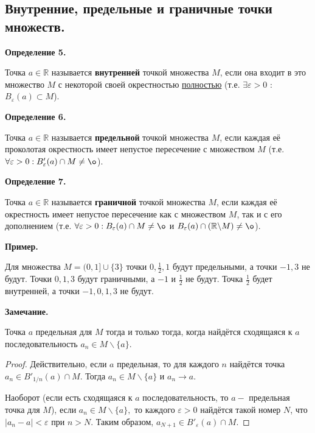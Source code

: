 \documentclass[12pt]{article}
\begin{document}
\subsection{Внутренние, предельные и граничные точки множеств.}

\textbf{Определение 5.}

Точка $a\in\mathbb{R}$ называется \textbf{внутренней} точкой множества $M$, если она входит в это множество $M$ с некоторой своей окрестностью \underline{полностью} (т.е. $\exists\varepsilon > 0$ : $B_\varepsilon(a)\subset M$).

\textbf{Определение 6.}

Точка $a\in\mathbb{R}$ называется \textbf{предельной} точкой множества $M$, если каждая её проколотая окрестность имеет непустое пересечение с множеством $M$ (т.е. $\forall\varepsilon > 0: B'_\varepsilon(a)\cap M\neq \o$).

\textbf{Определение 7.}

Точка $a\in\mathbb{R}$ называется \textbf{граничной} точкой множества $M$, если каждая её окрестность имеет непустое пересечение как с множеством $M$, так и с его дополнением (т.е. $\forall\varepsilon > 0: B_\varepsilon(a)\cap M\neq \o$ и $B_\varepsilon(a)\cap(\mathbb{R}\backslash M)\neq\o$).

\textbf{Пример.}

Для множества $M = (0, 1]\cup\{3\}$ точки $0, \frac{1}{2}, 1$ будут предельными, а точки $-1, 3$ не будут. Точки $0, 1, 3$ будут граничными, а $-1$ и $\frac{1}{2}$ не будут. Точка $\frac{1}{2}$ будет внутренней, а точки $-1, 0, 1, 3$ не будут.

\textbf{Замечание.}

Точка $a$ предельная для $M$ тогда и только тогда, когда найдётся сходящаяся к $a$ последовательность $a_n \in M\backslash\{a\}$. 

\begin{proof}
Действительно, если $a$ предельная, то для каждого $n$ найдётся точка \newline$a_n\in B'_{1/n}(a)\cap M$. Тогда $a_n\in M\backslash\{a\}$ и $a_n\rightarrow a.$ 

Наоборот (если есть сходящаяся к $a$ последовательность, то $a - $ предельная точка для $M$), если $a_n\in M\backslash\{a\},$ то каждого $\varepsilon>0$ найдётся такой номер $N$, что $|a_n - a|<\varepsilon$ при $n>N$. Таким образом, $a_{N+1}\in B'_\varepsilon(a)\cap M$.
\end{proof}

\newpage
\end{document}
